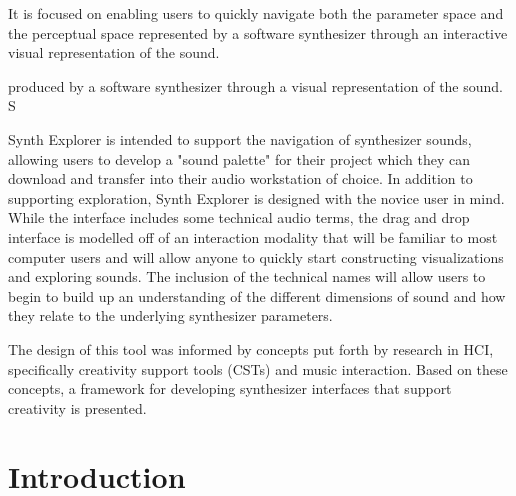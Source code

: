 It is focused on enabling users to quickly navigate both the parameter space and the perceptual space represented by a software synthesizer through an interactive visual representation of the sound.

produced by a software synthesizer through a visual representation of the sound. S

Synth Explorer is intended to support the navigation of synthesizer sounds, allowing users to develop a "sound palette" for their project which they can download and transfer into their audio workstation of choice. In addition to supporting exploration, Synth Explorer is designed with the novice user in mind. While the interface includes some technical audio terms, the drag and drop interface is modelled off of an interaction modality that will be familiar to most computer users and will allow anyone to quickly start constructing visualizations and exploring sounds. The inclusion of the technical names will allow users to begin to build up an understanding of the different dimensions of sound and how they relate to the underlying synthesizer parameters.


The design of this tool was informed by concepts put forth by research in HCI, specifically creativity support tools (CSTs) and music interaction. Based on these concepts, a framework for developing synthesizer interfaces that support creativity is presented.

\section{Introduction}



